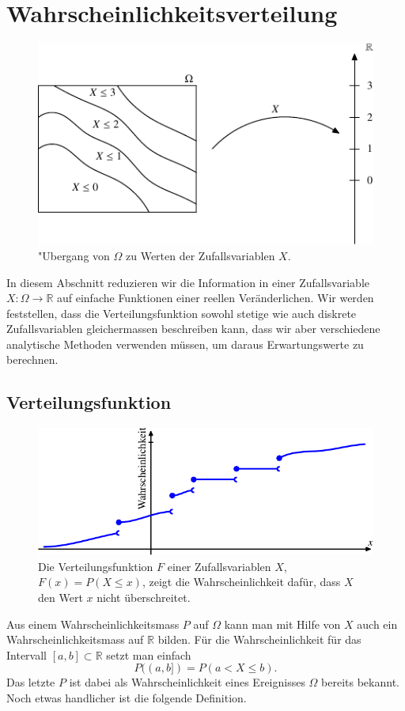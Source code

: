 \section{Wahrscheinlichkeitsverteilung}
\begin{figure}
\begin{center}
\includegraphics[width=0.7\hsize]{images/verteilungsfunktion-1}
\end{center}
\caption{"Ubergang von $\Omega$ zu Werten
der Zufallsvariablen $X$.
\label{bilduebergangzurverteilungsfunktion}}
\end{figure}
In diesem Abschnitt reduzieren wir die Information in einer Zufallsvariable
$X\colon\Omega\to\mathbb R$ auf einfache Funktionen einer reellen Veränderlichen.
Wir werden feststellen, dass die Verteilungsfunktion sowohl stetige wie auch
diskrete Zufallsvariablen gleichermassen beschreiben kann, dass wir
aber verschiedene analytische Methoden verwenden müssen, um daraus
Erwartungswerte zu berechnen.

\subsection{Verteilungsfunktion}
\begin{figure}
\begin{center}
\includegraphics{images/verteilungsfunktion-2}
\end{center}
\caption{Die Verteilungsfunktion $F$ einer Zufallsvariablen $X$,
$F(x)=P(X\le x)$, zeigt die Wahrscheinlichkeit dafür, dass $X$ den Wert $x$ nicht
überschreitet.
\label{bildverteilungsfunktion}}
\end{figure}
Aus einem Wahrscheinlichkeitsmass $P$ auf $\Omega$ kann man mit Hilfe
von $X$ auch ein Wahrscheinlichkeitsmass auf $\mathbb{R}$ bilden.
Für die
Wahrscheinlichkeit für das Intervall $[a,b]\subset\mathbb{R}$ setzt
man einfach
\[
P((a,b])=P(a< X\le b).
\]
Das letzte $P$ ist dabei als Wahrscheinlichkeit eines Ereignisses $\Omega$
bereits bekannt.
Noch etwas handlicher ist die folgende Definition.


